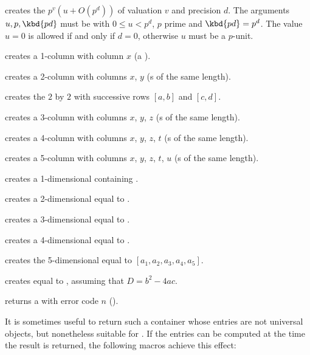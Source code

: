  creates the
 $p^v(u + O(p^d))$ of valuation $v$ and precision $d$.
The arguments $u, p, \kbd{pd}$ must be  with $0 \leq u < p^d$,
$p$ prime and $\kbd{pd} = p^d$. The value $u = 0$ is allowed if and only if
$d = 0$, otherwise $u$ must be a $p$-unit.

 creates a 1-column  with column $x$
(a ).

 creates a 2-column  with columns
$x$, $y$ (s of the same length).

 creates the $2$ by $2$
 with successive rows $[a,b]$ and $[c,d]$.

 creates a 3-column  with columns
$x$, $y$, $z$ (s of the same length).

 creates a 4-column 
with columns $x$, $y$, $z$, $t$ (s of the same length).

 creates a 5-column
 with columns $x$, $y$, $z$, $t$, $u$ (s of the same
length).

 creates a 1-dimensional  containing .

 creates a 2-dimensional  equal to
\kbd{[x,y]}.

 creates a 3-dimensional 
equal to \kbd{[x,y,z]}.

 creates a 4-dimensional 
equal to \kbd{[x,y,z,t]}.

 creates the
5-dimensional  equal to $[a_1,a_2,a_3,a_4,a_5]$.

 creates  equal
to , assuming that $D = b^2 - 4ac$.

 returns a  with error code $n$
().

\smallskip

It is sometimes useful to return such a container whose entries are not
universal objects, but nonetheless suitable for .
If the entries can be computed at the time the result is returned, the
following macros achieve this effect:


